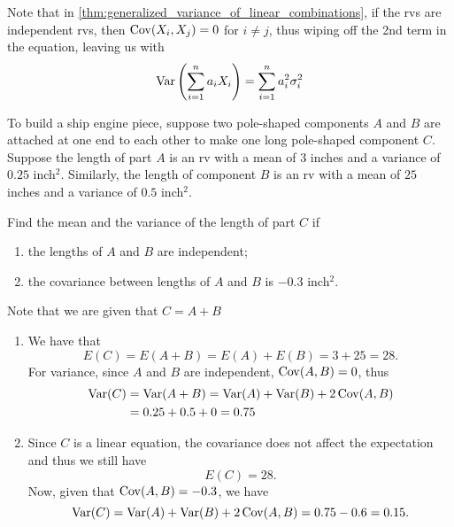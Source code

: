 \documentclass[notoc,notitlepage]{tufte-book}
\begin{document}
\begin{note}
  Note that in \cref{thm:generalized_variance_of_linear_combinations}, if the rvs are independent rvs, then $\operatorname{Cov}(X_i, X_j) = 0$ for $i \neq j$, thus wiping off the 2nd term in the equation, leaving us with
  \begin{equation*}
    \operatorname{Var} \left( \sum_{i=1}^{n} a_i X_i \right) = \sum_{i=1}^{n} a_i^2 \sigma_i^2
  \end{equation*}
\end{note}

\begin{eg}[Example 3.19]
  To build a ship engine piece, suppose two pole-shaped components $A$ and $B$ are attached at one end to each other to make one long pole-shaped component $C$. Suppose the length of part $A$ is an rv with a mean of $3$ inches and a variance of $0.25$ inch$^2$. Similarly, the length of component $B$ is an rv with a mean of $25$ inches and a variance of $0.5$ inch$^2$.

  Find the mean and the variance of the length of part $C$ if
  \begin{enumerate}
    \item the lengths of $A$ and $B$ are independent;
    \item the covariance between lengths of $A$ and $B$ is $-0.3$ inch$^2$.
  \end{enumerate}
\end{eg}

\begin{solution}
  Note that we are given that $C = A + B$
  \begin{enumerate}
    \item We have that
      \begin{equation*}
        E(C) = E(A + B) = E(A) + E(B) = 3 + 25 = 28.
      \end{equation*}
      For variance, since $A$ and $B$ are independent, $\operatorname{Cov}(A, B) = 0$, thus
      \begin{align*}
        \operatorname{Var}(C) &= \operatorname{Var}(A + B) = \operatorname{Var}(A) + \operatorname{Var}(B) + 2 \operatorname{Cov}(A, B) \\
          &= 0.25 + 0.5 + 0 = 0.75
      \end{align*}

    \item Since $C$ is a linear equation, the covariance does not affect the expectation and thus we still have
    \begin{equation*}
      E(C) = 28.
    \end{equation*}
    Now, given that $\operatorname{Cov}(A, B) = -0.3$, we have
    \begin{equation*}
      \operatorname{Var}(C) = \operatorname{Var}(A) + \operatorname{Var}(B) + 2 \operatorname{Cov}(A, B) = 0.75 - 0.6 = 0.15.
    \end{equation*}
  \end{enumerate}
\end{solution}
\end{document}
